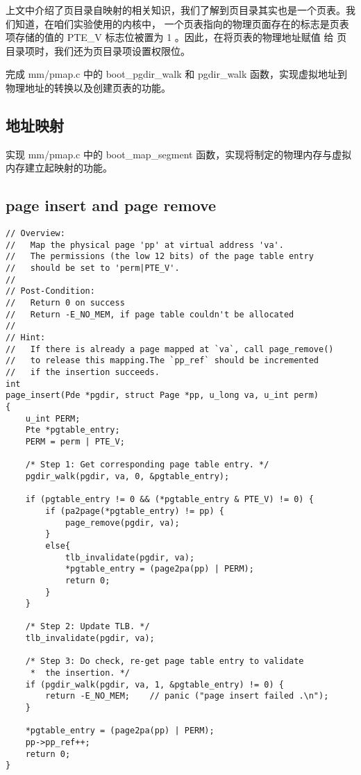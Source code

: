 上文中介绍了页目录自映射的相关知识，我们了解到页目录其实也是一个页表。我们知道，在咱们实验使用的内核中，
一个页表指向的物理页面存在的标志是页表项存储的值的 PTE\_V 标志位被置为 1 。因此，在将页表的物理地址赋值
给 页目录项时，我们还为页目录项设置权限位。

\begin{exercise}
完成 mm/pmap.c 中的 boot\_pgdir\_walk 和 pgdir\_walk 函数，实现虚拟地址到物理地址的转换以及创建页表的功能。
\end{exercise}

\subsection{地址映射}

\begin{exercise}
实现 mm/pmap.c 中的 boot\_map\_segment 函数，实现将制定的物理内存与虚拟内存建立起映射的功能。
\end{exercise}

\subsection{page insert and page remove}

\begin{verbatim}
// Overview:
//   Map the physical page 'pp' at virtual address 'va'.
//   The permissions (the low 12 bits) of the page table entry
//   should be set to 'perm|PTE_V'.
//
// Post-Condition:
//   Return 0 on success
//   Return -E_NO_MEM, if page table couldn't be allocated
//
// Hint:
//   If there is already a page mapped at `va`, call page_remove()
//   to release this mapping.The `pp_ref` should be incremented
//   if the insertion succeeds.
int
page_insert(Pde *pgdir, struct Page *pp, u_long va, u_int perm)
{
	u_int PERM;
	Pte *pgtable_entry;
	PERM = perm | PTE_V;

	/* Step 1: Get corresponding page table entry. */
	pgdir_walk(pgdir, va, 0, &pgtable_entry);

	if (pgtable_entry != 0 && (*pgtable_entry & PTE_V) != 0) {
		if (pa2page(*pgtable_entry) != pp) {
			page_remove(pgdir, va);
		}
		else{
			tlb_invalidate(pgdir, va);
			*pgtable_entry = (page2pa(pp) | PERM);
			return 0;
		}
	}

	/* Step 2: Update TLB. */
	tlb_invalidate(pgdir, va);

	/* Step 3: Do check, re-get page table entry to validate
	 *  the insertion. */
	if (pgdir_walk(pgdir, va, 1, &pgtable_entry) != 0) {
		return -E_NO_MEM;    // panic ("page insert failed .\n");
	}

	*pgtable_entry = (page2pa(pp) | PERM);
	pp->pp_ref++;
	return 0;
}
\end{verbatim}

